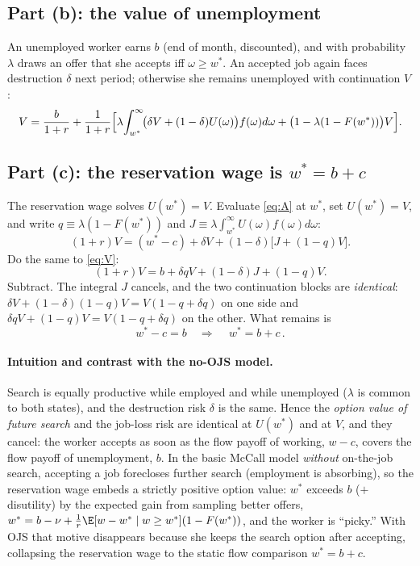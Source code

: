 \documentclass[11pt]{article}
\begin{document}
\subsection*{Part (b): the value of unemployment}

An unemployed worker earns $b$ (end of month, discounted), and with probability
$\lambda$ draws an offer that she accepts iff $\omega\ge w^*$. An accepted job
again faces destruction $\delta$ next period; otherwise she remains unemployed
with continuation $V$:
\begin{equation}\label{eq:V}
V=\frac{b}{1+r}+\frac{1}{1+r}\Bigl[\lambda\!\int_{w^*}^{\infty}\!
   \bigl(\delta V+(1-\delta)U(\omega)\bigr)f(\omega)d\omega
   +\bigl(1-\lambda(1-F(w^*))\bigr)V\Bigr].
\end{equation}

\subsection*{Part (c): the reservation wage is $w^{*}=b+c$}

The reservation wage solves $U(w^*)=V$. Evaluate \eqref{eq:A} at $w^*$, set
$U(w^*)=V$, and write $q\equiv\lambda(1-F(w^*))$ and
$J\equiv\lambda\!\int_{w^*}^{\infty}U(\omega)f(\omega)d\omega$:
\[
(1+r)V=(w^*-c)+\delta V+(1-\delta)\bigl[J+(1-q)V\bigr].
\]
Do the same to \eqref{eq:V}:
\[
(1+r)V=b+\delta q V+(1-\delta)J+(1-q)V.
\]
Subtract. The integral $J$ cancels, and the two continuation blocks are
\emph{identical}: $\delta V+(1-\delta)(1-q)V=V(1-q+\delta q)$ on one side and
$\delta qV+(1-q)V=V(1-q+\delta q)$ on the other. What remains is
\[
w^*-c=b\quad\Longrightarrow\quad\boxed{\,w^{*}=b+c\,.}
\]

\paragraph{Intuition and contrast with the no-OJS model.} Search is equally
productive while employed and while unemployed ($\lambda$ is common to both
states), and the destruction risk $\delta$ is the same. Hence the
\emph{option value of future search} and the job-loss risk are identical at
$U(w^*)$ and at $V$, and they cancel: the worker accepts as soon as the flow
payoff of working, $w-c$, covers the flow payoff of unemployment, $b$. In the
basic McCall model \emph{without} on-the-job search, accepting a job forecloses
further search (employment is absorbing), so the reservation wage embeds a
strictly positive option value: $w^*$ exceeds $b$ ($+$disutility) by the
expected gain from sampling better offers,
$w^{*}=b-\nu+\tfrac1r\E[w-w^*\mid w\ge w^*](1-F(w^*))$, and the worker is
``picky.'' With OJS that motive disappears because she keeps the search option
after accepting, collapsing the reservation wage to the static flow comparison
$w^*=b+c$.
\end{document}

